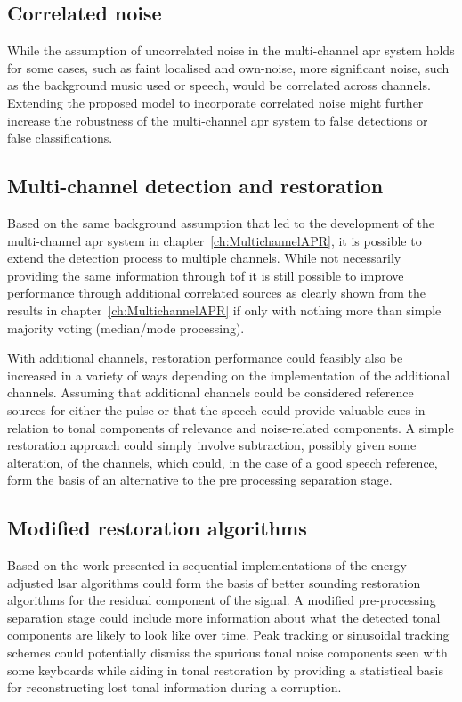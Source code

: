 \subsection{Correlated noise}
While the assumption of uncorrelated noise in the multi-channel \gls{apr} system holds for some cases, such as faint localised and own-noise, more significant noise, such as the background music used or speech, would be correlated across channels. Extending the proposed model to incorporate correlated noise might further increase the robustness of the multi-channel \gls{apr} system to false detections or false classifications.

\subsection{Multi-channel detection and restoration}
Based on the same background assumption that led to the development of the multi-channel \gls{apr} system in chapter~\ref{ch:MultichannelAPR}, it is possible to extend the detection process to multiple channels. While not necessarily providing the same information through \gls{tof} it is still possible to improve performance through additional correlated sources as clearly shown from the results in chapter~\ref{ch:MultichannelAPR} if only with nothing more than simple majority voting (median/mode processing).

With additional channels, restoration performance could feasibly also be increased in a variety of ways depending on the implementation of the additional channels. Assuming that additional channels could be considered reference sources for either the pulse or that the speech could provide valuable cues in relation to tonal components of relevance and noise-related components. A simple restoration approach could simply involve subtraction, possibly given some alteration, of the channels, which could, in the case of a good speech reference, form the basis of an alternative to the pre processing separation stage.

\subsection{Modified restoration algorithms}
Based on the work presented in \cite{Esquef2006} sequential implementations of the energy adjusted \gls{lsar} algorithms could form the basis of better sounding restoration algorithms for the residual component of the signal. A modified pre-processing separation stage could include more information about what the detected tonal components are likely to look like over time. Peak tracking or sinusoidal tracking schemes\cite{McAulay1986} could potentially dismiss the spurious tonal noise components seen with some keyboards while aiding in tonal restoration by providing a statistical basis for reconstructing lost tonal information during a corruption.

